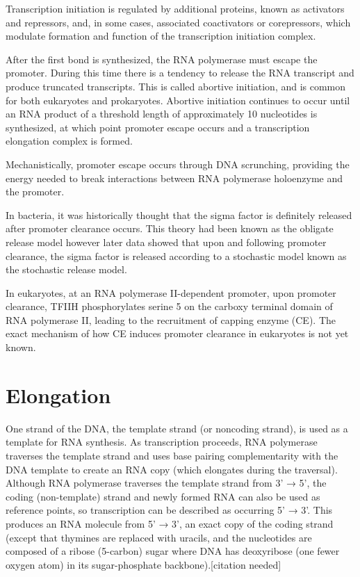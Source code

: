 Transcription initiation is regulated by additional proteins, known as activators and repressors, and, in some cases, associated coactivators or corepressors, which modulate formation and function of the transcription initiation complex.

After the first bond is synthesized, the RNA polymerase must escape the promoter. During this time there is a tendency to release the RNA transcript and produce truncated transcripts. This is called abortive initiation, and is common for both eukaryotes and prokaryotes. Abortive initiation continues to occur until an RNA product of a threshold length of approximately 10 nucleotides is synthesized, at which point promoter escape occurs and a transcription elongation complex is formed.

Mechanistically, promoter escape occurs through DNA scrunching, providing the energy needed to break interactions between RNA polymerase holoenzyme and the promoter.

In bacteria, it was historically thought that the sigma factor is definitely released after promoter clearance occurs. This theory had been known as the obligate release model however later data showed that upon and following promoter clearance, the sigma factor is released according to a stochastic model known as the stochastic release model.

In eukaryotes, at an RNA polymerase II-dependent promoter, upon promoter clearance, TFIIH phosphorylates serine 5 on the carboxy terminal domain of RNA polymerase II, leading to the recruitment of capping enzyme (CE). The exact mechanism of how CE induces promoter clearance in eukaryotes is not yet known.

\hypertarget{elongation-2}{%
\section{Elongation}\label{elongation-2}}

One strand of the DNA, the template strand (or noncoding strand), is used as a template for RNA synthesis. As transcription proceeds, RNA polymerase traverses the template strand and uses base pairing complementarity with the DNA template to create an RNA copy (which elongates during the traversal). Although RNA polymerase traverses the template strand from 3' → 5', the coding (non-template) strand and newly formed RNA can also be used as reference points, so transcription can be described as occurring 5' → 3'. This produces an RNA molecule from 5' → 3', an exact copy of the coding strand (except that thymines are replaced with uracils, and the nucleotides are composed of a ribose (5-carbon) sugar where DNA has deoxyribose (one fewer oxygen atom) in its sugar-phosphate backbone).{[}citation needed{]}



